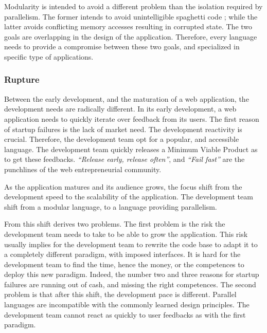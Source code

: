 Modularity is intended to avoid a different problem than the isolation required by parallelism.
The former intends to avoid unintelligible spaghetti code ; while the latter avoids conflicting memory accesses resulting in corrupted state.
The two goals are overlapping in the design of the application.
Therefore, every language needs to provide a compromise between these two goals, and specialized in specific type of applications.

\subsubsection{Rupture}

Between the early development, and the maturation of a web application, the development needs are radically different.
In its early development, a web application needs to quickly iterate over feedback from its users.
The first reason of startup failures is the lack of market need.
The development reactivity is crucial.
Therefore, the development team opt for a popular, and accessible language.
The development team quickly releases a Minimum Viable Product as to get these feedbacks.
\textit{``Release early, release often''}, and \textit{``Fail fast''} are the punchlines of the web entrepreneurial community.

As the application matures and its audience grows, the focus shift from the development speed to the scalability of the application.
The development team shift from a modular language, to a language providing parallelism.

From this shift derives two problems.
The first problem is the risk the development team needs to take to be able to grow the application.
This risk usually implies for the development team to rewrite the code base to adapt it to a completely different paradigm, with imposed interfaces.
It is hard for the development team to find the time, hence the money, or the competences to deploy this new paradigm.
Indeed, the number two and three reasons for startup failures are running out of cash, and missing the right competences.
The second problem is that after this shift, the development pace is different.
Parallel languages are incompatible with the commonly learned design principles.
The development team cannot react as quickly to user feedbacks as with the first paradigm.

